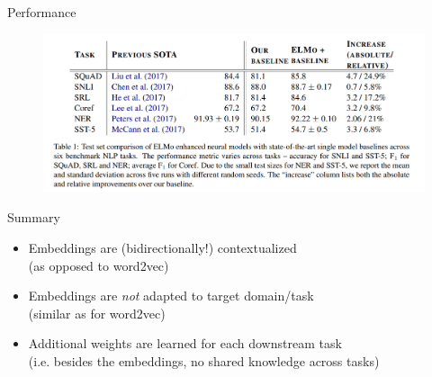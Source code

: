 
\begin{vbframe}{Performance}

\vfill
			
	\begin{figure}
		\centering
		\includegraphics[width = 12cm]{figure/elmo-sota.png}\\ 
	\end{figure}

\vfill

\end{vbframe}


\begin{vbframe}{Summary}

\vfill

	\begin{itemize}
		\item Embeddings are (bidirectionally!) contextualized \\
					(as opposed to word2vec)
		\item Embeddings are \textit{not} adapted to target domain/task \\
					(similar as for word2vec)
		\item Additional weights are learned for each downstream task \\
					(i.e. besides the embeddings, no shared knowledge across tasks)
	\end{itemize}

\vfill

\end{vbframe}


\endlecture

